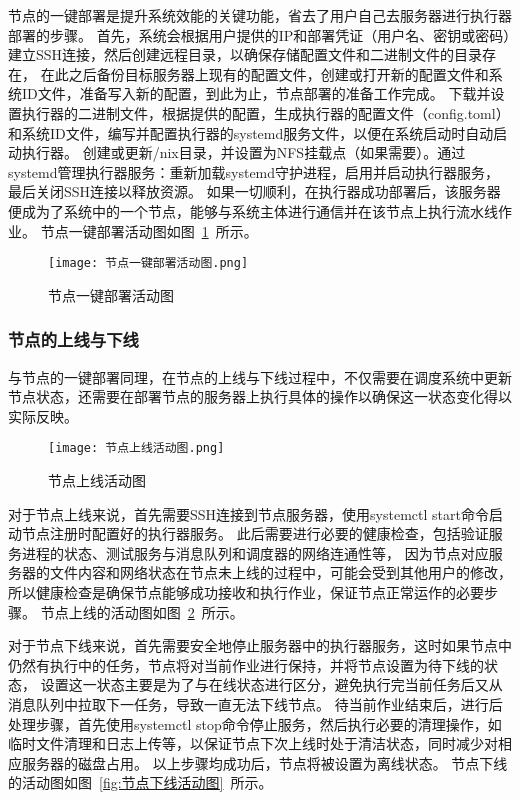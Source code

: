 节点的一键部署是提升系统效能的关键功能，省去了用户自己去服务器进行执行器部署的步骤。
首先，系统会根据用户提供的IP和部署凭证（用户名、密钥或密码）建立SSH连接，然后创建远程目录，以确保存储配置文件和二进制文件的目录存在，
在此之后备份目标服务器上现有的配置文件，创建或打开新的配置文件和系统ID文件，准备写入新的配置，到此为止，节点部署的准备工作完成。
下载并设置执行器的二进制文件，根据提供的配置，生成执行器的配置文件（config.toml）和系统ID文件，编写并配置执行器的systemd服务文件，以便在系统启动时自动启动执行器。
创建或更新/nix目录，并设置为NFS挂载点（如果需要）。通过systemd管理执行器服务：重新加载systemd守护进程，启用并启动执行器服务，最后关闭SSH连接以释放资源。
如果一切顺利，在执行器成功部署后，该服务器便成为了系统中的一个节点，能够与系统主体进行通信并在该节点上执行流水线作业。
节点一键部署活动图如图~\ref{fig:节点一键部署活动图}~所示。

\begin{figure}[H]
  \centering
  \texttt{[image: 节点一键部署活动图.png]}
  \caption{节点一键部署活动图}
  \label{fig:节点一键部署活动图}
\end{figure}

\subsubsection{节点的上线与下线}
与节点的一键部署同理，在节点的上线与下线过程中，不仅需要在调度系统中更新节点状态，还需要在部署节点的服务器上执行具体的操作以确保这一状态变化得以实际反映。

\begin{figure}[h]
  \centering
  \texttt{[image: 节点上线活动图.png]}
  \caption{节点上线活动图}
  \label{fig:节点上线活动图}
\end{figure}

对于节点上线来说，首先需要SSH连接到节点服务器，使用systemctl start命令启动节点注册时配置好的执行器服务。
此后需要进行必要的健康检查，包括验证服务进程的状态、测试服务与消息队列和调度器的网络连通性等，
因为节点对应服务器的文件内容和网络状态在节点未上线的过程中，可能会受到其他用户的修改，所以健康检查是确保节点能够成功接收和执行作业，保证节点正常运作的必要步骤。
节点上线的活动图如图~\ref{fig:节点上线活动图}~所示。

对于节点下线来说，首先需要安全地停止服务器中的执行器服务，这时如果节点中仍然有执行中的任务，节点将对当前作业进行保持，并将节点设置为待下线的状态，
设置这一状态主要是为了与在线状态进行区分，避免执行完当前任务后又从消息队列中拉取下一任务，导致一直无法下线节点。
待当前作业结束后，进行后处理步骤，首先使用systemctl stop命令停止服务，然后执行必要的清理操作，如临时文件清理和日志上传等，以保证节点下次上线时处于清洁状态，同时减少对相应服务器的磁盘占用。
以上步骤均成功后，节点将被设置为离线状态。
节点下线的活动图如图~\ref{fig:节点下线活动图}~所示。

